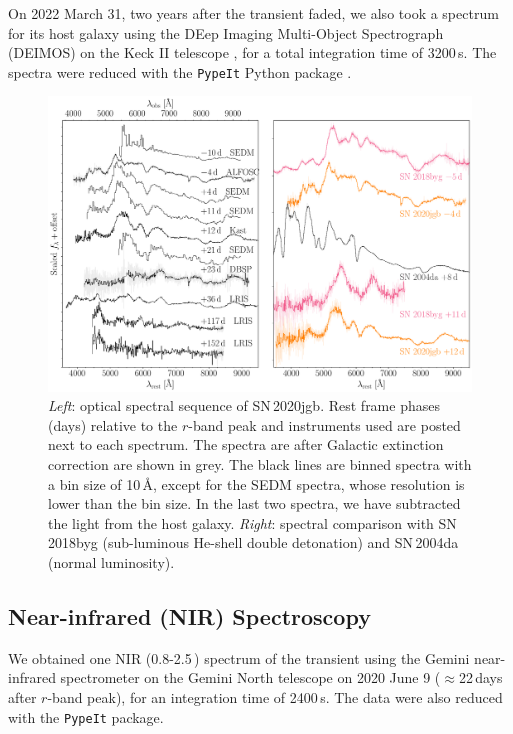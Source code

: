 \documentclass[twocolumn]{aastex631}
\newcommand{\sn}{SN\,2020jgb}
\begin{document}
On 2022 March 31, two years after the transient faded, we also took a spectrum for its host galaxy using the DEep Imaging Multi-Object Spectrograph (DEIMOS) on the Keck II telescope \citep{DEIMOS_2003}, for a total integration time of 3200\,s. The spectra were reduced with the \texttt{PypeIt} Python package \citep{pypeit:joss_pub,pypeit:zenodo}.


\begin{figure}
    \centering
    \includegraphics[width=\textwidth]{optical_spec_evolution.pdf}
    \caption{\textit{Left}: optical spectral sequence of \sn. Rest frame phases (days) relative to the $r$-band peak and instruments used are posted next to each spectrum. The spectra are after Galactic extinction correction are shown in grey. The black lines are binned spectra with a bin size of 10\,\r{A}, except for the SEDM spectra, whose resolution is lower than the bin size. In the last two spectra, we have subtracted the light from the host galaxy. %
    \textit{Right}: spectral comparison with SN\,2018byg (sub-luminous He-shell double detonation) and SN\,2004da (normal luminosity).} %
    \label{fig:spec_evo}
\end{figure}

\subsection{Near-infrared (NIR) Spectroscopy}
We obtained one NIR (0.8-2.5\,\micron) spectrum of the transient using the Gemini near-infrared spectrometer \citep[GNIRS;][]{GNIRS1998} on the Gemini North telescope on 2020 June 9 ($\approx$22\,days after $r$-band peak), for an integration time of 2400\,s. The data were also reduced with the \texttt{PypeIt} package.
\end{document}
